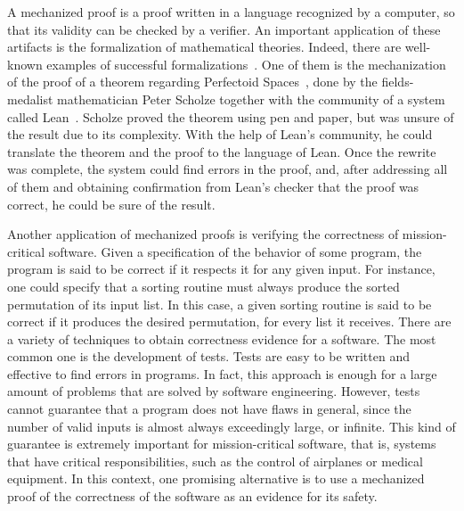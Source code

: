 A mechanized proof is a proof written in a language recognized by a computer, so that its validity can be checked by a verifier. An important application of these artifacts is the formalization of mathematical theories. Indeed, there are well-known examples of successful formalizations~\cite{fourColors, kepler}. One of them is the mechanization of the proof of a theorem regarding Perfectoid Spaces~\cite{scholze}, done by the fields-medalist mathematician Peter Scholze together with the community of a system called Lean~\cite{lean}. Scholze proved the theorem using pen and paper, but was unsure of the result due to its complexity. With the help of Lean's community, he could translate the theorem and the proof to the language of Lean. Once the rewrite was complete, the system could find errors in the proof, and, after addressing all of them and obtaining confirmation from Lean's checker that the proof was correct, he could be sure of the result.

Another application of mechanized proofs is verifying the correctness of mission-critical software. Given a specification of the behavior of some program, the program is said to be correct if it respects it for any given input. For instance, one could specify that a sorting routine must always produce the sorted permutation of its input list. In this case, a given sorting routine is said to be correct if it produces the desired permutation, for every list it receives. There are a variety of techniques to obtain correctness evidence for a software. The most common one is the development of tests. Tests are easy to be written and effective to find errors in programs. In fact, this approach is enough for a large amount of problems that are solved by software engineering. However, tests cannot guarantee that a program does not have flaws in general, since the number of valid inputs is almost always exceedingly large, or infinite. This kind of guarantee is extremely important for mission-critical software, that is, systems that have critical responsibilities, such as the control of airplanes or medical equipment. In this context, one promising alternative is to use a mechanized proof of the correctness of the software as an evidence for its safety.

